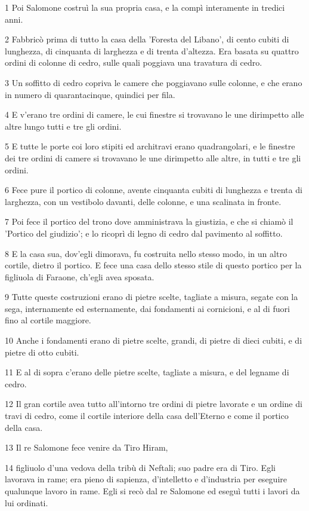 \par 1 Poi Salomone costruì la sua propria casa, e la compì interamente in tredici anni.
\par 2 Fabbricò prima di tutto la casa della 'Foresta del Libano', di cento cubiti di lunghezza, di cinquanta di larghezza e di trenta d'altezza. Era basata su quattro ordini di colonne di cedro, sulle quali poggiava una travatura di cedro.
\par 3 Un soffitto di cedro copriva le camere che poggiavano sulle colonne, e che erano in numero di quarantacinque, quindici per fila.
\par 4 E v'erano tre ordini di camere, le cui finestre si trovavano le une dirimpetto alle altre lungo tutti e tre gli ordini.
\par 5 E tutte le porte coi loro stipiti ed architravi erano quadrangolari, e le finestre dei tre ordini di camere si trovavano le une dirimpetto alle altre, in tutti e tre gli ordini.
\par 6 Fece pure il portico di colonne, avente cinquanta cubiti di lunghezza e trenta di larghezza, con un vestibolo davanti, delle colonne, e una scalinata in fronte.
\par 7 Poi fece il portico del trono dove amministrava la giustizia, e che si chiamò il 'Portico del giudizio'; e lo ricoprì di legno di cedro dal pavimento al soffitto.
\par 8 E la casa sua, dov'egli dimorava, fu costruita nello stesso modo, in un altro cortile, dietro il portico. E fece una casa dello stesso stile di questo portico per la figliuola di Faraone, ch'egli avea sposata.
\par 9 Tutte queste costruzioni erano di pietre scelte, tagliate a misura, segate con la sega, internamente ed esternamente, dai fondamenti ai cornicioni, e al di fuori fino al cortile maggiore.
\par 10 Anche i fondamenti erano di pietre scelte, grandi, di pietre di dieci cubiti, e di pietre di otto cubiti.
\par 11 E al di sopra c'erano delle pietre scelte, tagliate a misura, e del legname di cedro.
\par 12 Il gran cortile avea tutto all'intorno tre ordini di pietre lavorate e un ordine di travi di cedro, come il cortile interiore della casa dell'Eterno e come il portico della casa.
\par 13 Il re Salomone fece venire da Tiro Hiram,
\par 14 figliuolo d'una vedova della tribù di Neftali; suo padre era di Tiro. Egli lavorava in rame; era pieno di sapienza, d'intelletto e d'industria per eseguire qualunque lavoro in rame. Egli si recò dal re Salomone ed eseguì tutti i lavori da lui ordinati.
